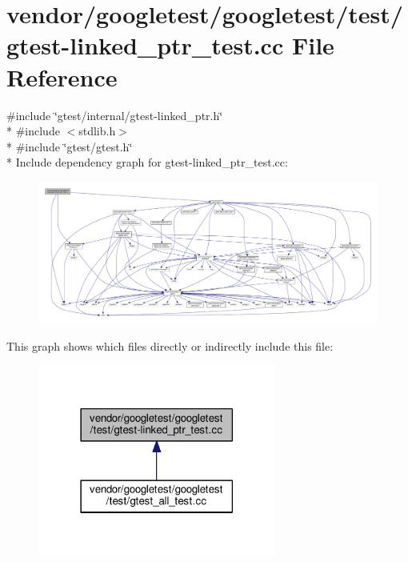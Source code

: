 \hypertarget{gtest-linked__ptr__test_8cc}{}\section{vendor/googletest/googletest/test/gtest-\/linked\+\_\+ptr\+\_\+test.cc File Reference}
\label{gtest-linked__ptr__test_8cc}
{\ttfamily \#include \char`\"{}gtest/internal/gtest-\/linked\+\_\+ptr.\+h\char`\"{}}\\*
{\ttfamily \#include $<$stdlib.\+h$>$}\\*
{\ttfamily \#include \char`\"{}gtest/gtest.\+h\char`\"{}}\\*
Include dependency graph for gtest-\/linked\+\_\+ptr\+\_\+test.cc\+:\nopagebreak
\begin{figure}[H]
\begin{center}
\leavevmode
\includegraphics[width=350pt]{gtest-linked__ptr__test_8cc__incl}
\end{center}
\end{figure}
This graph shows which files directly or indirectly include this file\+:\nopagebreak
\begin{figure}[H]
\begin{center}
\leavevmode
\includegraphics[width=222pt]{gtest-linked__ptr__test_8cc__dep__incl}
\end{center}
\end{figure}
